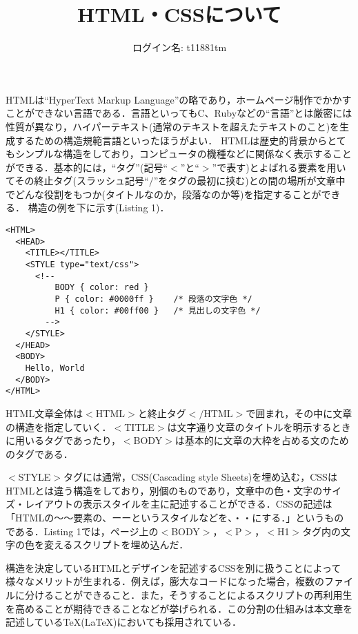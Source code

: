\documentclass{jsarticle}
\title{HTML・CSSについて}
\date{}
\author{ログイン名: t11881tm}
\begin{document}
\maketitle
HTMLは``HyperText Markup Language''の略であり，ホームページ制作でかかすことができない言語である．言語といってもC、Rubyなどの``言語''とは厳密には性質が異なり，ハイパーテキスト(通常のテキストを超えたテキストのこと)を生成するための構造規範言語といったほうがよい．
HTMLは歴史的背景からとてもシンプルな構造をしており，コンピュータの機種などに関係なく表示することができる．基本的には，``タグ''(記号``$<$''と``$>$''で表す)とよばれる要素を用いてその終止タグ(スラッシュ記号``$/$''をタグの最初に挟む)との間の場所が文章中でどんな役割をもつか(タイトルなのか，段落なのか等)を指定することができる．
構造の例を下に示す(Listing 1)．

\medskip
\begin{lstlisting}[caption=My HTML Example(./sample.html)]
<HTML>
  <HEAD>
    <TITLE></TITLE>
    <STYLE type="text/css">
      <!--
          BODY { color: red }
          P { color: #0000ff }    /* 段落の文字色 */
          H1 { color: #00ff00 }   /* 見出しの文字色 */
        -->
    </STYLE>
  </HEAD>
  <BODY>
    Hello, World
  </BODY>
</HTML>
\end{lstlisting}

HTML文章全体は$<$HTML$>$と終止タグ$<$$/$HTML$>$で囲まれ，その中に文章の構造を指定していく．$<$TITLE$>$は文字通り文章のタイトルを明示するときに用いるタグであったり，$<$BODY$>$は基本的に文章の大枠を占める文のためのタグである．

$<$STYLE$>$タグには通常，CSS(Cascading style Sheets)を埋め込む，CSSはHTMLとは違う構造をしており，別個のものであり，文章中の色・文字のサイズ・レイアウトの表示スタイルを主に記述することができる．CSSの記述は「HTMLの〜〜要素の、ーーというスタイルなどを、・・にする．」というものである．Listing 1では，ページ上の$<$BODY$>$，$<$P$>$，$<$H1$>$タグ内の文字の色を変えるスクリプトを埋め込んだ．

構造を決定しているHTMLとデザインを記述するCSSを別に扱うことによって様々なメリットが生まれる．例えば，膨大なコードになった場合，複数のファイルに分けることができること．また，そうすることによるスクリプトの再利用生を高めることが期待できることなどが挙げられる．この分割の仕組みは本文章を記述している\TeX(\LaTeX)においても採用されている．
\end{document}
